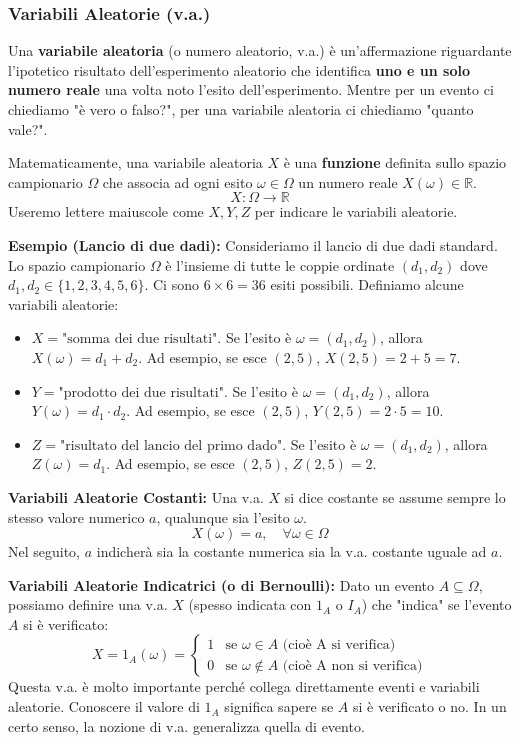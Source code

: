 \subsubsection{Variabili Aleatorie (v.a.)}
\begin{definition}
Una \textbf{variabile aleatoria} (o numero aleatorio, v.a.) è un'affermazione riguardante l'ipotetico risultato dell'esperimento aleatorio che identifica \textbf{uno e un solo numero reale} una volta noto l'esito dell'esperimento.
Mentre per un evento ci chiediamo "è vero o falso?", per una variabile aleatoria ci chiediamo "quanto vale?".

Matematicamente, una variabile aleatoria $X$ è una \textbf{funzione} definita sullo spazio campionario $\Omega$ che associa ad ogni esito $\omega \in \Omega$ un numero reale $X(\omega) \in \mathbb{R}$.
\[ X: \Omega \to \mathbb{R} \]
Useremo lettere maiuscole come $X, Y, Z$ per indicare le variabili aleatorie.
\end{definition}

\begin{example}
\textbf{Esempio (Lancio di due dadi):}
Consideriamo il lancio di due dadi standard. Lo spazio campionario $\Omega$ è l'insieme di tutte le coppie ordinate $(d_1, d_2)$ dove $d_1, d_2 \in \{1, 2, 3, 4, 5, 6\}$. Ci sono $6 \times 6 = 36$ esiti possibili.
Definiamo alcune variabili aleatorie:
\begin{itemize}
    \item $X = \text{"somma dei due risultati"}$.
    Se l'esito è $\omega = (d_1, d_2)$, allora $X(\omega) = d_1 + d_2$.
    Ad esempio, se esce $(2, 5)$, $X(2,5) = 2+5=7$.
    \item $Y = \text{"prodotto dei due risultati"}$.
    Se l'esito è $\omega = (d_1, d_2)$, allora $Y(\omega) = d_1 \cdot d_2$.
    Ad esempio, se esce $(2, 5)$, $Y(2,5) = 2 \cdot 5=10$.
    \item $Z = \text{"risultato del lancio del primo dado"}$.
    Se l'esito è $\omega = (d_1, d_2)$, allora $Z(\omega) = d_1$.
    Ad esempio, se esce $(2, 5)$, $Z(2,5) = 2$.
\end{itemize}
\end{example}

\textbf{Variabili Aleatorie Costanti:}
Una v.a. $X$ si dice costante se assume sempre lo stesso valore numerico $a$, qualunque sia l'esito $\omega$.
\[ X(\omega) = a, \quad \forall \omega \in \Omega \]
Nel seguito, $a$ indicherà sia la costante numerica sia la v.a. costante uguale ad $a$.

\textbf{Variabili Aleatorie Indicatrici (o di Bernoulli):}
Dato un evento $A \subseteq \Omega$, possiamo definire una v.a. $X$ (spesso indicata con $1_A$ o $I_A$) che "indica" se l'evento $A$ si è verificato:
\[ X = 1_A(\omega) = \begin{cases} 1 & \text{se } \omega \in A \text{ (cioè A si verifica)} \\ 0 & \text{se } \omega \notin A \text{ (cioè A non si verifica)} \end{cases} \]
Questa v.a. è molto importante perché collega direttamente eventi e variabili aleatorie. Conoscere il valore di $1_A$ significa sapere se $A$ si è verificato o no. In un certo senso, la nozione di v.a. generalizza quella di evento.

